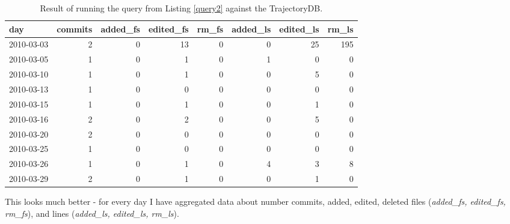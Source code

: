 \documentclass[a4paper,10pt]{article}
\numberwithin{equation}{subsection}
\begin{document}
\begin{table}[hb]
\noindent\begin{minipage}{\textwidth}
  \caption{Result of running the query from Listing \ref{query2} against the TrajectoryDB.}
  \begin{tabularx}{\textwidth}{ | X | r | r | r | r | r | r | r | }
  \hline           
day & commits & added\_fs & edited\_fs & rm\_fs & added\_ls & edited\_ls & rm\_ls\\ 
\hline           
2010-03-03 & 2 & 0 & 13 & 0 & 0 & 25 & 195\\ 
2010-03-05 & 1 & 0 & 1 & 0 & 1 & 0 & 0\\ 
2010-03-10 & 1 & 0 & 1 & 0 & 0 & 5 & 0\\ 
2010-03-13 & 1 & 0 & 0 & 0 & 0 & 0 & 0\\ 
2010-03-15 & 1 & 0 & 1 & 0 & 0 & 1 & 0\\ 
2010-03-16 & 2 & 0 & 2 & 0 & 0 & 5 & 0\\ 
2010-03-20 & 2 & 0 & 0 & 0 & 0 & 0 & 0\\ 
2010-03-25 & 1 & 0 & 0 & 0 & 0 & 0 & 0\\ 
2010-03-26 & 1 & 0 & 1 & 0 & 4 & 3 & 8\\ 
2010-03-29 & 2 & 0 & 1 & 0 & 0 & 1 & 0\\
\hline    
  \end{tabularx}
\end{minipage}
  \label{tab:second}
\end{table}

This looks much better - for every day I have aggregated data about number commits, added, edited, deleted files (\emph{added\_fs, edited\_fs, rm\_fs}),
and lines (\emph{added\_ls, edited\_ls, rm\_ls}).
\end{document}
